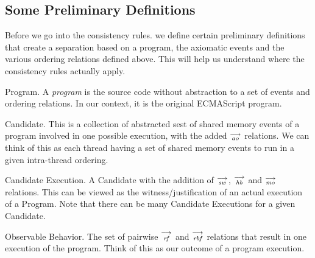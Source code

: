 
    \subsection{Some Preliminary Definitions}
        
        Before we go into the consistency rules. we define certain preliminary definitions that create a separation based on a program, the axiomatic events and the various ordering relations defined above. This will help us understand where the consistency rules actually apply. 
        
        \begin{definition}{Program.} 
            A \emph{program} is the source code without abstraction to a set of events and ordering relations. In our context, it is the original ECMAScript program. 
        \end{definition}
        
        \begin{definition}{Candidate.}
            This is a collection of abstracted sest of shared memory events of a program involved in one possible execution, with the added $\stackrel{\longrightarrow}{_\textit{ao}}$ relations. We can think of this as each thread having a set of shared memory events to run in a given intra-thread ordering.
        \end{definition}
        
        \begin{definition}{Candidate Execution.}
            A Candidate with the addition of $\stackrel{\longrightarrow}{_\textit{sw}}$, $\stackrel{\longrightarrow}{_\textit{hb}}$ and $\stackrel{\longrightarrow}{_\textit{mo}}$ relations. This can be viewed as the witness/justification of an actual execution of a Program. Note that there can be many Candidate Executions for a given Candidate.
        \end{definition}
        
        \begin{definition}{Observable Behavior.}
        The set of pairwise $\stackrel{\longrightarrow}{_\textit{rf}}$ and $\stackrel{\longrightarrow}{_\textit{rbf}}$ relations that result in one execution of the program. Think of this as our outcome of a program execution.
        \end{definition}
